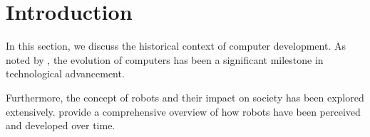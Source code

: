 \section{Introduction}

In this section, we discuss the historical context of computer development. As noted by \cite{Asimov:1984:DWF:577473}, the evolution of computers has been a significant milestone in technological advancement.

Furthermore, the concept of robots and their impact on society has been explored extensively. \cite{Asimov:1984:DWF:577473,Asimov:1985:RMM:4983} provide a comprehensive overview of how robots have been perceived and developed over time.
